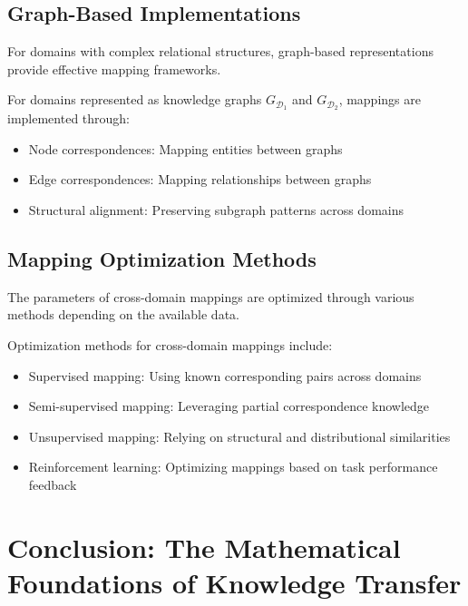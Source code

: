 \subsection{Graph-Based Implementations}

For domains with complex relational structures, graph-based representations provide effective mapping frameworks.

\begin{definition}
For domains represented as knowledge graphs $G_{\mathcal{D}_1}$ and $G_{\mathcal{D}_2}$, mappings are implemented through:
\begin{itemize}
    \item Node correspondences: Mapping entities between graphs
    \item Edge correspondences: Mapping relationships between graphs
    \item Structural alignment: Preserving subgraph patterns across domains
\end{itemize}
\end{definition}

\subsection{Mapping Optimization Methods}

The parameters of cross-domain mappings are optimized through various methods depending on the available data.

\begin{definition}
Optimization methods for cross-domain mappings include:
\begin{itemize}
    \item Supervised mapping: Using known corresponding pairs across domains
    \item Semi-supervised mapping: Leveraging partial correspondence knowledge
    \item Unsupervised mapping: Relying on structural and distributional similarities
    \item Reinforcement learning: Optimizing mappings based on task performance feedback
\end{itemize}
\end{definition}

\section{Conclusion: The Mathematical Foundations of Knowledge Transfer}

